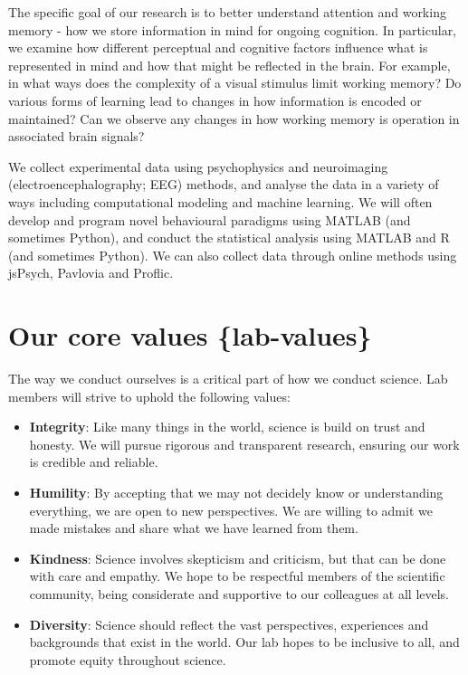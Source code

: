 \documentclass[
]{book}
\theoremstyle{definition}
\theoremstyle{definition}
\theoremstyle{definition}
\theoremstyle{definition}
\theoremstyle{remark}
\begin{document}
The specific goal of our research is to better understand attention and working memory - how we store information in mind for ongoing cognition. In particular, we examine how different perceptual and cognitive factors influence what is represented in mind and how that might be reflected in the brain. For example, in what ways does the complexity of a visual stimulus limit working memory? Do various forms of learning lead to changes in how information is encoded or maintained? Can we observe any changes in how working memory is operation in associated brain signals?

We collect experimental data using psychophysics and neuroimaging (electroencephalography; EEG) methods, and analyse the data in a variety of ways including computational modeling and machine learning. We will often develop and program novel behavioural paradigms using MATLAB (and sometimes Python), and conduct the statistical analysis using MATLAB and R (and sometimes Python). We can also collect data through online methods using jsPsych, Pavlovia and Proflic.

\hypertarget{our-core-values-lab-values}{%
\section{Our core values \{lab-values\}}\label{our-core-values-lab-values}}

The way we conduct ourselves is a critical part of how we conduct science. Lab members will strive to uphold the following values:

\begin{itemize}
\item
  \textbf{Integrity}: Like many things in the world, science is build on trust and honesty. We will pursue rigorous and transparent research, ensuring our work is credible and reliable.
\item
  \textbf{Humility}: By accepting that we may not decidely know or understanding everything, we are open to new perspectives. We are willing to admit we made mistakes and share what we have learned from them.
\item
  \textbf{Kindness}: Science involves skepticism and criticism, but that can be done with care and empathy. We hope to be respectful members of the scientific community, being considerate and supportive to our colleagues at all levels.
\item
  \textbf{Diversity}: Science should reflect the vast perspectives, experiences and backgrounds that exist in the world. Our lab hopes to be inclusive to all, and promote equity throughout science.
\end{itemize}
\end{document}
